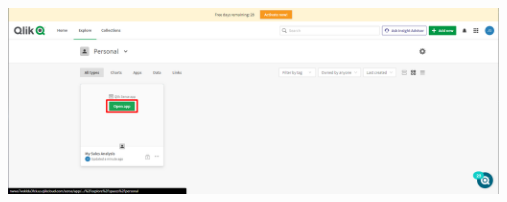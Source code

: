 \documentclass[12pt,letterpaper]{article}
\newcommand\tab[1][1cm]{\hspace*{#1}}
\begin{document}
\begin{enumerate}[\tab 1.]
\begin{itemize}
            \begin{center}
                \includegraphics[width=13cm]{./img/img2.2.png}
            \end{center}
        \end{itemize}
    \end{enumerate}
\end{document}
